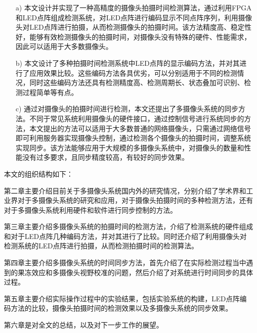 \begin{itemize}

\item[a)]本文设计并实现了一种高精度的摄像头拍摄时间检测算法，通过利用FPGA和LED点阵组成检测系统，对LED点阵进行编码显示不同点阵序列，利用摄像头对LED点阵进行拍摄，从而检测摄像头的拍摄时间。该方法精度高、稳定性好，能够有效检测摄像头的拍摄时间，对摄像头没有特殊的硬件、性能需求，因此可以适用于大多数摄像头。

\item[b)]本文设计了多种拍摄时间检测系统中LED点阵的显示编码方法，并对其进行了应用效果比较。这些编码方法各具优劣，可以分别适用于不同的检测情况，同时这些编码方法还具有检测精度高、检测周期长、状态叠加可识别、检测过程简单等有点。

\item[c)]通过对摄像头的拍摄时间进行检测，本文还提出了多摄像头系统的同步方法。不同于常见系统利用摄像头的硬件接口，通过控制信号进行系统同步的方法，本文提出的方法可以适用于大多数普通的网络摄像头，只需通过网络信号即可利用服务器实现摄像头控制，通过检测各个摄像头的拍摄时间，调整系统实现同步。该方法能够应用于大规模的多摄像头系统中，对摄像头的数量和性能没有过多要求，且同步精度较高，有较好的同步效果。

\end{itemize}

本文的组织结构如下：

第二章主要介绍目前关于多摄像头系统国内外的研究情况，分别介绍了学术界和工业界对于多摄像头系统的研究和应用，对于摄像头拍摄时间的多种检测方法，还有对于多摄像头系统利用硬件和软件进行同步控制的方法。

第三章主要介绍多摄像头系统的拍摄时间的检测方法，介绍了检测系统的硬件组成和对于LED点阵几种编码方法，并对其进行了比较。同时还介绍了利用摄像头对检测系统的LED点阵进行拍摄，从而检测拍摄时间的检测算法。

第四章主要介绍多摄像头系统的时间同步方法，首先介绍了在实际检测过程当中遇到的果冻效应和多摄像头视野校准的问题，然后介绍了对系统进行时间同步的具体过程。

第五章主要介绍实际操作过程中的实验结果，包括实验系统的构建，LED点阵编码方法的比较，摄像头拍摄时间的检测效果以及多摄像头系统的同步效果。

第六章是对全文的总结，以及对下一步工作的展望。




































